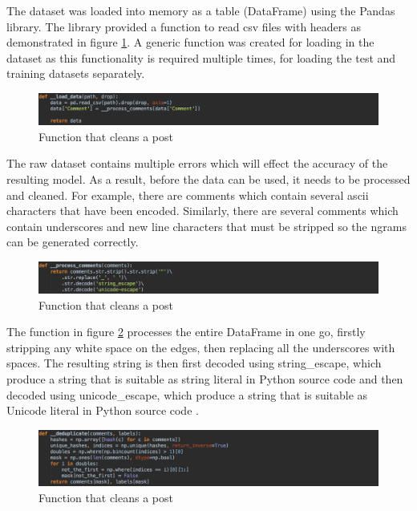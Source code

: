  The dataset was loaded into memory as a table (DataFrame) using the Pandas library. The library provided a function to read csv files with headers as demonstrated in figure \ref{fig:AbuseDetection_LoadData}. A generic function was created for loading in the dataset as this functionality is required multiple times, for loading the test and training datasets separately.

\begin{figure}[H]
	\centering
	\includegraphics[width=\textwidth]{Images/Implementation/DataProcessing/AbuseDetection/LoadData}
	\caption{Function that cleans a post}
	\label{fig:AbuseDetection_LoadData}
\end{figure}

The raw dataset contains multiple errors which will effect the accuracy of the resulting model. As a result, before the data can be used, it needs to be processed and cleaned. For example, there are comments which contain several ascii characters that have been encoded. Similarly, there are several comments which contain underscores and new line characters that must be stripped so the ngrams can be generated correctly.

\begin{figure}[H]
	\centering
	\includegraphics[width=\textwidth]{Images/Implementation/DataProcessing/AbuseDetection/ProcessComments}
	\caption{Function that cleans a post}
	\label{fig:AbuseDetection-ProcessComments}
\end{figure}

The function in figure \ref{fig:AbuseDetection-ProcessComments} processes the entire DataFrame in one go, firstly stripping any white space on the edges, then replacing all the underscores with spaces. The resulting string is then first decoded using string\_escape, which produce a string that is suitable as string literal in Python source code and then decoded using unicode\_escape, which produce a string that is suitable as Unicode literal in Python source code \cite{Python:Codes}.

\begin{figure}[H]
	\centering
	\includegraphics[width=\textwidth]{Images/Implementation/DataProcessing/AbuseDetection/Deduplicate}
	\caption{Function that cleans a post}
	\label{fig:AbuseDetection-Deduplicate}
\end{figure}


